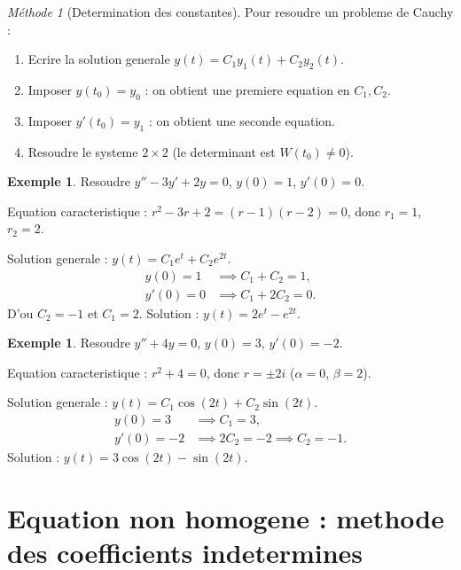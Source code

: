 \documentclass[12pt,a4paper,openany]{book}
\theoremstyle{definition}
\newtheorem{exemple}[definition]{Exemple}
\theoremstyle{plain}
\theoremstyle{remark}
\newtheorem{methode}[definition]{Méthode}
\begin{document}
\begin{methode}[Determination des constantes]\label{meth:constantes}
Pour resoudre un probleme de Cauchy :
\begin{enumerate}
  \item Ecrire la solution generale $y(t) = C_1 y_1(t) + C_2 y_2(t)$.
  \item Imposer $y(t_0) = y_0$ : on obtient une premiere equation en $C_1, C_2$.
  \item Imposer $y'(t_0) = y_1$ : on obtient une seconde equation.
  \item Resoudre le systeme $2 \times 2$ (le determinant est $W(t_0) \neq 0$).
\end{enumerate}
\end{methode}

\begin{exemple}\label{ex:cauchy-edl2}
Resoudre $y'' - 3y' + 2y = 0$, $y(0) = 1$, $y'(0) = 0$.

Equation caracteristique : $r^2 - 3r + 2 = (r-1)(r-2) = 0$, donc $r_1 = 1$, $r_2 = 2$.

Solution generale : $y(t) = C_1 e^t + C_2 e^{2t}$.
\begin{align*}
  y(0) = 1 &\implies C_1 + C_2 = 1, \\
  y'(0) = 0 &\implies C_1 + 2C_2 = 0.
\end{align*}
D'ou $C_2 = -1$ et $C_1 = 2$. Solution : $y(t) = 2e^t - e^{2t}$.
\end{exemple}

\begin{exemple}\label{ex:cauchy-oscillation}
Resoudre $y'' + 4y = 0$, $y(0) = 3$, $y'(0) = -2$.

Equation caracteristique : $r^2 + 4 = 0$, donc $r = \pm 2i$ ($\alpha = 0$, $\beta = 2$).

Solution generale : $y(t) = C_1 \cos(2t) + C_2 \sin(2t)$.
\begin{align*}
  y(0) = 3 &\implies C_1 = 3, \\
  y'(0) = -2 &\implies 2C_2 = -2 \implies C_2 = -1.
\end{align*}
Solution : $y(t) = 3\cos(2t) - \sin(2t)$.
\end{exemple}

\section{Equation non homogene : methode des coefficients indetermines}\label{sec:coefficients-indetermines}
\end{document}
